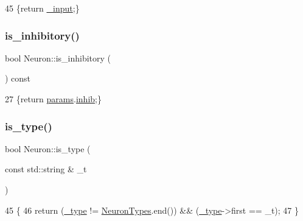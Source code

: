 \begin{DoxyCode}
45 \{\textcolor{keywordflow}{return} \hyperlink{classNeuron_ac1311b3b22122a67743615ee40caba6d}{\_input};\}
\end{DoxyCode}
\mbox{\label{classNeuron_a649c6080b0749e6e642bf9df8f191d2d}} 
\subsubsection{\texorpdfstring{is\+\_\+inhibitory()}{is\_inhibitory()}}
{\footnotesize\ttfamily bool Neuron\+::is\+\_\+inhibitory (\begin{DoxyParamCaption}{ }\end{DoxyParamCaption}) const\hspace{0.3cm}{\ttfamily [inline]}}


\begin{DoxyCode}
27 \{\textcolor{keywordflow}{return} \hyperlink{classNeuron_a9427965b6669c7c35c327689de7a4d63}{params}.\hyperlink{structNeuronParams_a751856d77a821cbd361b774d8653bbe6}{inhib};\}
\end{DoxyCode}
\mbox{\label{classNeuron_a37459ba1dc4b0060707c33bf2ad5b10d}} 
\subsubsection{\texorpdfstring{is\+\_\+type()}{is\_type()}}
{\footnotesize\ttfamily bool Neuron\+::is\+\_\+type (\begin{DoxyParamCaption}\item[{const std\+::string \&}]{\+\_\+t }\end{DoxyParamCaption})}


\begin{DoxyCode}
45                                         \{
46     \textcolor{keywordflow}{return} (\hyperlink{classNeuron_af48de7c2ad739fc5d57bfa2f3b1f7663}{\_type} != \hyperlink{classNeuron_ab4b47274e756b72923d2f8a9a5037d23}{NeuronTypes}.end()) && (\hyperlink{classNeuron_af48de7c2ad739fc5d57bfa2f3b1f7663}{\_type}->first == \_t);
47 \}
\end{DoxyCode}
\mbox{\label{classNeuron_a47ea1a8f25dd62a34c9e0bdc0b7ae7fb}} 
